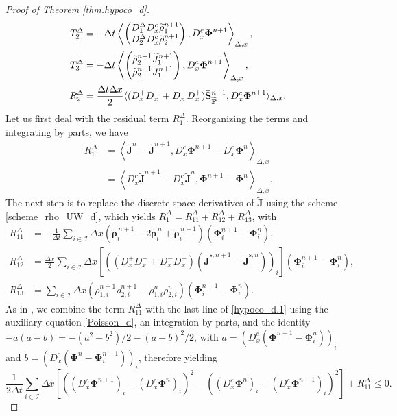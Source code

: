 \documentclass[reqno]{amsart}
\newcommand{\Dx}{\Delta x}
\newcommand{\II}{\mathcal{I}}
\newcommand{\Ft}{{\widetilde{F}}}
\newcommand{\rhot}{\widetilde{\rho}}
\newcommand{\Jt}{\widetilde{J}}
\newcommand{\Ftbf}{\mathbf{\Ft}}
\newcommand{\Sbf}{\mathbf{S}}
\newcommand{\Phibf}{\boldsymbol{\Phi}}
\newcommand{\rhotbf}{\boldsymbol{\rhot}}
\newcommand{\Jtbf}{\mathbf{\Jt}}
\newcommand{\lla}{\left\langle}
\newcommand{\rra}{\right\rangle}
\newcommand{\overbar}[1]{\mkern 1.5mu\overline{\mkern-1.5mu#1\mkern-1.5mu}\mkern 1.5mu}
\numberwithin{equation}{section}
\begin{document}
\begin{proof}[Proof of Theorem \ref{thm.hypoco_d}]
\begin{align*}
        T_{2}^\Delta&=-\Delta t\lla\begin{pmatrix} D_1^\Delta D_x^c\rhot_1^{n+1}\\ D_2^\Delta D_x^c\rhot_2^{n+1}\end{pmatrix},D_x^c\Phibf^{n+1}\rra_{\Delta,x},\\
        T_{3}^\Delta&= -\Delta t \lla \begin{pmatrix} \rhot_2^{n+1}\Jt_1^{n+1}\\ \rhot_2^{n+1}\Jt_1^{n+1} \end{pmatrix},D_x^c\Phibf^{n+1}\rra_{\Delta,x},\\
        R_2^\Delta&= \frac{\Delta t\Dx}{2}\langle (D_x^+D_x^-+D_x^-D_x^+)\overbar{\Sbf}^{n+1}_\Ftbf,D_x^c\Phibf^{n+1}\rangle_{\Delta,x}.
    \end{align*}
    Let us first deal with the residual term $R_{1}^\Delta$. Reorganizing the terms and integrating by parts, we have
    \begin{align*}
        R_{1}^\Delta&=\lla \Jtbf^n-\Jtbf^{n+1},D_x^c\Phibf^{n+1}-D_x^c\Phibf^{n}\rra_{\Delta,x}\\
        &= \lla D_x^c\Jtbf^{n+1}-D_x^c\Jtbf^n,\Phibf^{n+1}-\Phibf^n\rra_{\Delta,x}.
    \end{align*}
    The next step is to replace the discrete space derivatives of $\Jtbf$ using the scheme \eqref{scheme_rho_UW_d}, which yields $R_{1}^\Delta=R_{11}^\Delta+R_{12}^\Delta+R_{13}^\Delta$, with
    \begin{align*}
        R_{11}^\Delta&= -\frac{1}{\Delta t}\sum_{i\in\II}\Delta x\left(\rhotbf_{i}^{\,n+1}-2\rhotbf_{i}^{\,n}+\rhotbf_{i}^{\,n-1}\right)(\Phibf_i^{n+1}-\Phibf_i^n),\\
        R_{12}^\Delta&=\frac{\Dx}{2}\sum_{i\in\II}\Dx \left[\left((D_x^+D_x^-+D_x^-D_x^+)(\Jtbf^{\mathrm{s},n+1}-\Jtbf^{\mathrm{s},n})\right)_i\right](\Phibf_i^{n+1}-\Phibf_i^n),\\
        R_{13}^\Delta&= \sum_{i\in\II}\Dx \left(\rho_{1,i}^{n+1}\rho_{2,i}^{n+1}-\rho_{1,i}^n\rho_{2,i}^n\right)(\Phibf_{i}^{n+1}-\Phibf_i^n).
    \end{align*}    
    As in \cite{BCLR2025}, we combine the term $R_{11}^\Delta$ with the last line of \eqref{hypoco_d.1} using the auxiliary equation \eqref{Poisson_d}, an integration by parts, and the identity $-a(a-b)=-(a^2-b^2)/2-(a-b)^2/2$, with $a=\left(D_x^c(\Phibf^{n+1}-\Phibf_i^n)\right)_i$ and  $b=\left(D_x^c(\Phibf^{n}-\Phibf_i^{n-1})\right)_i$, therefore yielding 
    \begin{equation*}
        \frac{1}{2\Delta t}\sum_{i\in\II}\Dx \left[\left((D_x^c\Phibf^{n+1})_i-(D_x^c\Phibf^{n})_i\right)^2- \left((D_x^c\Phibf^n)_i-(D_x^c\Phibf^{n-1})_i\right)^2\right]+R_{11}^\Delta\leq 0.
    \end{equation*}
    

\end{proof}
\end{document}
